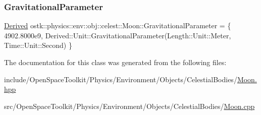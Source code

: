 \subsubsection{\texorpdfstring{Gravitational\+Parameter}{GravitationalParameter}}
{\footnotesize\ttfamily \hyperlink{classostk_1_1physics_1_1units_1_1_derived}{Derived} ostk\+::physics\+::env\+::obj\+::celest\+::\+Moon\+::\+Gravitational\+Parameter = \{ 4902.\+8000e9, Derived\+::\+Unit\+::\+Gravitational\+Parameter(\+Length\+::\+Unit\+::\+Meter, Time\+::\+Unit\+::\+Second) \}\hspace{0.3cm}{\ttfamily [static]}}



The documentation for this class was generated from the following files\+:\begin{DoxyCompactItemize}
\item 
include/\+Open\+Space\+Toolkit/\+Physics/\+Environment/\+Objects/\+Celestial\+Bodies/\hyperlink{_objects_2_celestial_bodies_2_moon_8hpp}{Moon.\+hpp}\item 
src/\+Open\+Space\+Toolkit/\+Physics/\+Environment/\+Objects/\+Celestial\+Bodies/\hyperlink{_objects_2_celestial_bodies_2_moon_8cpp}{Moon.\+cpp}\end{DoxyCompactItemize}
